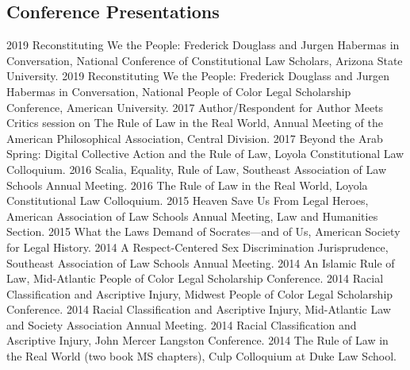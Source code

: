 \documentclass[letterpaper]{moderncv}
\begin{document}
\subsection{Conference Presentations}
\cvitem
{2019}
{Reconstituting We the People: Frederick Douglass and Jurgen Habermas in Conversation, National Conference of Constitutional Law Scholars, Arizona State University.}
\vspace{1mm}
\cvitem
{2019}
{Reconstituting We the People: Frederick Douglass and Jurgen Habermas in Conversation, National People of Color Legal Scholarship Conference, American University.}
\vspace{1mm}
\cvitem
{2017}
{Author/Respondent for Author Meets Critics session on The Rule of Law in the Real World, Annual Meeting of the American Philosophical Association, Central Division.}
\vspace{1mm}
\cvitem
{2017}
{Beyond the Arab Spring: Digital Collective Action and the Rule of Law, Loyola Constitutional Law Colloquium.}
\vspace{1mm}
\cvitem
{2016}
{Scalia, Equality, Rule of Law, Southeast Association of Law Schools Annual Meeting.}
\vspace{1mm}
\cvitem
{2016}
{The Rule of Law in the Real World, Loyola Constitutional Law Colloquium.}
\vspace{1mm}
\cvitem
{2015}
{Heaven Save Us From Legal Heroes, American Association of Law Schools Annual Meeting, Law and Humanities Section.}
\vspace{1mm}
\cvitem
{2015}
{What the Laws Demand of Socrates---and of Us, American Society for Legal History.}
\vspace{1mm}
\cvitem
{2014}
{A Respect-Centered Sex Discrimination Jurisprudence, Southeast Association of Law Schools Annual Meeting.}
\vspace{1mm}
\cvitem
{2014}
{An Islamic Rule of Law, Mid-Atlantic People of Color Legal Scholarship Conference.}
\vspace{1mm}
\cvitem
{2014}
{Racial Classification and Ascriptive Injury, Midwest People of Color Legal Scholarship Conference.}
\vspace{1mm}
\cvitem
{2014}
{Racial Classification and Ascriptive Injury, Mid-Atlantic Law and Society Association Annual Meeting.}
\vspace{1mm}
\cvitem
{2014}
{Racial Classification and Ascriptive Injury, John Mercer Langston Conference.}
\vspace{1mm}
\cvitem
{2014}
{The Rule of Law in the Real World (two book MS chapters), Culp Colloquium at Duke Law School.}
\end{document}
